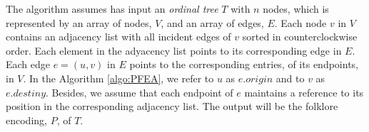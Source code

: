 %  	
\normalsize
The algorithm assumes has input an \emph{ordinal tree} $T$ with $n$ nodes, which is represented by an array of nodes, $V$, and an array of edges, $E$. Each node $v$ in $V$ contains an adjacency list with all incident edges of $v$ sorted in counterclockwise order. Each element in the adyacency list points to its corresponding edge in $E$. Each edge $e=(u,v)$ in $E$ points to the corresponding entries, of its endpoints, in $V$. In the Algorithm \ref{algo:PFEA}, we refer to $u$ as $e.origin$ and to $v$ as $e.destiny$. Besides, we assume that each endpoint of $e$ maintains a reference to its position in the corresponding adjacency list. The output will be the folklore encoding, $P$, of $T$.

